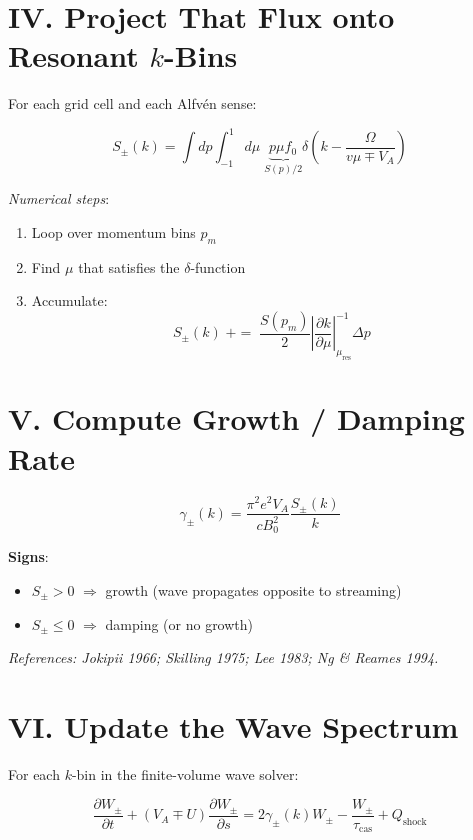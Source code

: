 \section*{IV. Project That Flux onto Resonant $k$-Bins}

For each grid cell and each Alfvén sense:

\begin{equation}
S_\pm(k) =
\int dp \int_{-1}^{1} d\mu\;
\underbrace{p \mu f_0}_{S(p)/2}
\delta\left(k - \frac{\Omega}{v \mu \mp V_A} \right)
\tag{3}
\end{equation}

\textit{Numerical steps}:
\begin{enumerate}
    \item Loop over momentum bins $p_m$
    \item Find $\mu$ that satisfies the $\delta$-function
    \item Accumulate:
    \[
    S_\pm(k) \;{+}{=}\; \frac{S(p_m)}{2}
    \left| \frac{\partial k}{\partial \mu} \right|^{-1}_{\mu_{\text{res}}} \Delta p
    \]
\end{enumerate}

\section*{V. Compute Growth / Damping Rate}

\begin{equation}
\boxed{
\gamma_\pm(k) =
\frac{\pi^2 e^2 V_A}{c B_0^2}
\frac{S_\pm(k)}{k}
}
\tag{4}
\end{equation}

\textbf{Signs}:
\begin{itemize}
    \item $S_\pm > 0$ $\Rightarrow$ growth (wave propagates opposite to streaming)
    \item $S_\pm \le 0$ $\Rightarrow$ damping (or no growth)
\end{itemize}

\textit{References: Jokipii 1966; Skilling 1975; Lee 1983; Ng \& Reames 1994.}

\section*{VI. Update the Wave Spectrum}

For each $k$-bin in the finite-volume wave solver:

\begin{equation}
\boxed{
\frac{\partial W_\pm}{\partial t}
+ (V_A \mp U)\frac{\partial W_\pm}{\partial s}
= 2\gamma_\pm(k) W_\pm
- \frac{W_\pm}{\tau_{\text{cas}}}
+ Q_{\text{shock}}
}
\tag{5}
\end{equation}

